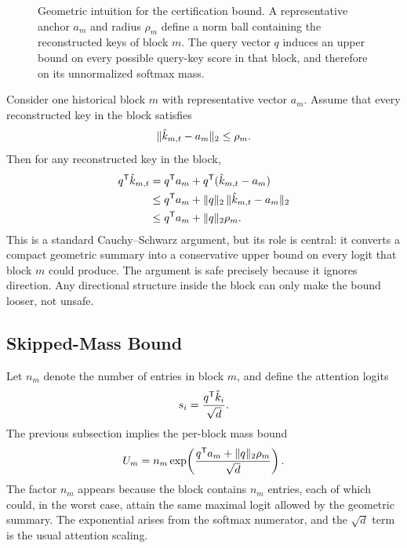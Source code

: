 \begin{figure}[t]
  \centering
  
  \caption{Geometric intuition for the certification bound. A representative anchor \(a_m\) and radius \(\rho_m\) define a norm ball containing the reconstructed keys of block \(m\). The query vector \(q\) induces an upper bound on every possible query-key score in that block, and therefore on its unnormalized softmax mass.}
  \label{fig:geometry}
\end{figure}

Consider one historical block \(m\) with representative vector \(a_m\). Assume that every reconstructed key in the block satisfies
\begin{equation}
  \lVert \hat{k}_{m,t} - a_m \rVert_2 \le \rho_m.
\end{equation}
Then for any reconstructed key in the block,
\begin{align}
  q^{\mathsf{T}} \hat{k}_{m,t}
  &=
  q^{\mathsf{T}} a_m + q^{\mathsf{T}}(\hat{k}_{m,t}-a_m)
  \\
  &\le
  q^{\mathsf{T}} a_m + \lVert q \rVert_2\,\lVert \hat{k}_{m,t}-a_m \rVert_2
  \\
  &\le
  q^{\mathsf{T}} a_m + \lVert q \rVert_2\rho_m.
\end{align}
This is a standard Cauchy--Schwarz argument, but its role is central: it converts a compact geometric summary into a conservative upper bound on every logit that block \(m\) could produce. The argument is safe precisely because it ignores direction. Any directional structure inside the block can only make the bound looser, not unsafe.

\subsection{Skipped-Mass Bound}

Let \(n_m\) denote the number of entries in block \(m\), and define the attention logits
\begin{equation}
  s_i = \frac{q^{\mathsf{T}} \hat{k}_i}{\sqrt{d}}.
\end{equation}
The previous subsection implies the per-block mass bound
\begin{equation}
  U_m
  =
  n_m \operatorname{exp}\!\left(
    \frac{q^{\mathsf{T}} a_m + \lVert q \rVert_2\rho_m}{\sqrt{d}}
  \right).
\end{equation}
The factor \(n_m\) appears because the block contains \(n_m\) entries, each of which could, in the worst case, attain the same maximal logit allowed by the geometric summary. The exponential arises from the softmax numerator, and the \(\sqrt{d}\) term is the usual attention scaling.

